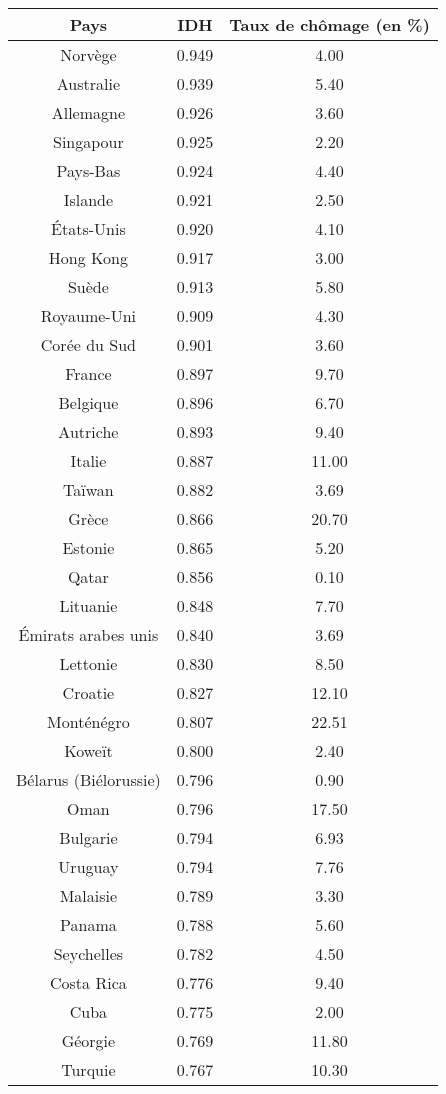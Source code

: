 \documentclass[paper=a4, fontsize=11pt]{scrartcl} %
\numberwithin{equation}{section} %
\numberwithin{figure}{section} %
\numberwithin{table}{section} %
\begin{document}
\begin{longtable}{|c|c|c|}
\hline
\textbf{Pays} & \textbf{IDH} & \textbf{Taux de chômage (en \%)} \\ \hline
\hline \hline
Norvège	& 0.949 & 4.00 \\
Australie	& 0.939 & 5.40 \\
Allemagne	& 0.926 & 3.60 \\
Singapour	& 0.925 & 2.20 \\
Pays-Bas	& 0.924 & 4.40 \\
Islande	& 0.921 & 2.50 \\
États-Unis	& 0.920 & 4.10 \\
Hong Kong	& 0.917 & 3.00 \\
Suède	& 0.913 & 5.80 \\
Royaume-Uni	& 0.909 & 4.30 \\
Corée du Sud	& 0.901 & 3.60 \\
France	& 0.897 & 9.70 \\
Belgique	& 0.896 & 6.70 \\
Autriche	& 0.893 & 9.40 \\
Italie	& 0.887 & 11.00 \\
Taïwan	& 0.882 & 3.69 \\
Grèce	& 0.866 & 20.70 \\
Estonie	& 0.865 & 5.20 \\
Qatar	& 0.856 & 0.10 \\
Lituanie	& 0.848 & 7.70 \\
Émirats arabes unis	& 0.840 & 3.69 \\
Lettonie	& 0.830 & 8.50 \\
Croatie	& 0.827 & 12.10 \\
Monténégro	& 0.807 & 22.51 \\
Koweït	& 0.800 & 2.40 \\
Bélarus (Biélorussie)	& 0.796 & 0.90 \\
Oman	& 0.796 & 17.50 \\
Bulgarie	& 0.794 & 6.93 \\
Uruguay	& 0.794 & 7.76 \\
Malaisie	& 0.789 & 3.30 \\
Panama	& 0.788 & 5.60 \\
Seychelles	& 0.782 & 4.50 \\
Costa Rica	& 0.776 & 9.40 \\
Cuba	& 0.775 & 2.00 \\
Géorgie	& 0.769 & 11.80 \\
Turquie	& 0.767 & 10.30 \\

\end{longtable}
\end{document}
